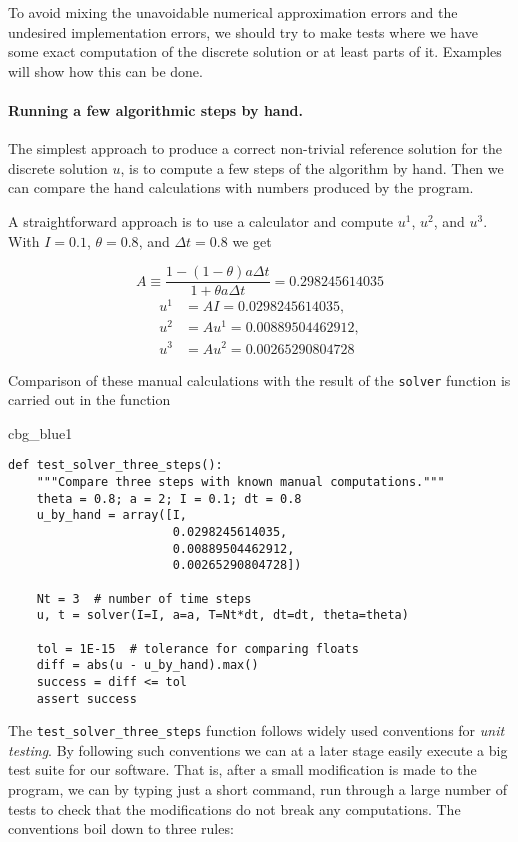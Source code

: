 \documentclass[graybox,sectrefs,envcountresetchap,open=right,final]{svmonodo}
\newenvironment{_cod_tight}[1]{
   \def\FrameCommand{\colorbox{#1}}
   \FrameRule0.6pt\MakeFramed {\FrameRestore}\vskip3mm}
   {\vskip0mm\endMakeFramed}
\newenvironment{cod}[1]{
\bgroup\rmfamily
\fboxsep=0mm\relax
\begin{_cod_tight}{#1}
\list{}{\parsep=-2mm\parskip=0mm\topsep=0pt\leftmargin=2mm
\rightmargin=2\leftmargin\leftmargin=4pt\relax}
\item\relax}
{\endlist\end{_cod_tight}\egroup}
\begin{document}
To avoid
mixing the unavoidable numerical approximation errors and the
undesired implementation errors, we should try to make tests where
we have some exact
computation of the discrete solution or at least parts of it.
Examples will show how this can be done.

\paragraph{Running a few algorithmic steps by hand.}
The simplest approach to produce a correct non-trivial reference
solution for the discrete solution $u$, is to compute a few steps of
the algorithm by hand. Then we can compare the hand calculations with
numbers produced by the program.

A straightforward approach is to use a calculator and
compute $u^1$, $u^2$, and $u^3$. With $I=0.1$, $\theta=0.8$,
and $\Delta t =0.8$ we get

\[ A\equiv \frac{1 - (1-\theta) a\Delta t}{1 + \theta a \Delta t} = 0.298245614035\]
\begin{align*}
u^1 &= AI=0.0298245614035,\\ 
u^2 &= Au^1= 0.00889504462912,\\ 
u^3 &=Au^2= 0.00265290804728
\end{align*}

Comparison of these manual calculations with the result of the
\texttt{solver} function is carried out in the function

\begin{cod}{cbg_blue1}\begin{Verbatim}[numbers=none,fontsize=\fontsize{9pt}{9pt},baselinestretch=0.95,xleftmargin=2mm]
def test_solver_three_steps():
    """Compare three steps with known manual computations."""
    theta = 0.8; a = 2; I = 0.1; dt = 0.8
    u_by_hand = array([I,
                       0.0298245614035,
                       0.00889504462912,
                       0.00265290804728])

    Nt = 3  # number of time steps
    u, t = solver(I=I, a=a, T=Nt*dt, dt=dt, theta=theta)

    tol = 1E-15  # tolerance for comparing floats
    diff = abs(u - u_by_hand).max()
    success = diff <= tol
    assert success
\end{Verbatim}
\end{cod}
\noindent
The \Verb!test_solver_three_steps! function follows widely used conventions
for \emph{unit testing}. By following such conventions we can at a later
stage easily execute a big test suite for our software. That is, after
a small modification is made to the program, we can by typing just
a short command, run through a large number of tests to check that the
modifications do not break any computations.
The conventions boil down to three rules:
\end{document}
